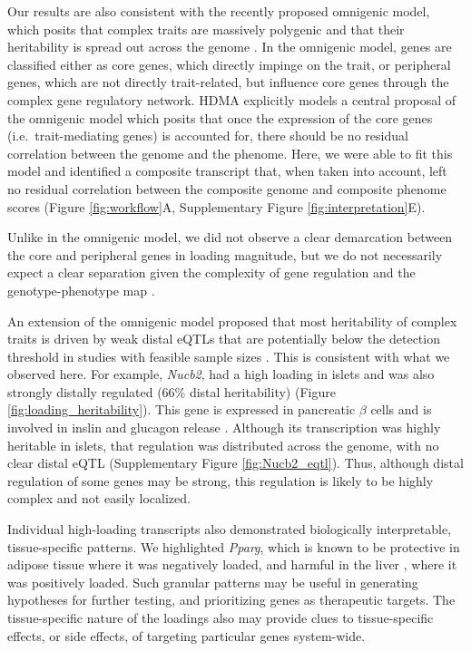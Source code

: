 \documentclass[
]{article}
\begin{document}
Our results are also consistent with the recently proposed omnigenic
model, which posits that complex traits are massively polygenic and that
their heritability is spread out across the genome \cite{pmid28622505}.
In the omnigenic model, genes are classified either as core genes, which
directly impinge on the trait, or peripheral genes, which are not
directly trait-related, but influence core genes through the complex
gene regulatory network. HDMA explicitly models a central proposal of
the omnigenic model which posits that once the expression of the core
genes (i.e.~trait-mediating genes) is accounted for, there should be no
residual correlation between the genome and the phenome. Here, we were
able to fit this model and identified a composite transcript that, when
taken into account, left no residual correlation between the composite
genome and composite phenome scores (Figure \ref{fig:workflow}A,
Supplementary Figure \ref{fig:interpretation}E).

Unlike in the omnigenic model, we did not observe a clear demarcation
between the core and peripheral genes in loading magnitude, but we do
not necessarily expect a clear separation given the complexity of gene
regulation and the genotype-phenotype map \cite{pmid29906445}.

An extension of the omnigenic model proposed that most heritability of
complex traits is driven by weak distal eQTLs that are potentially below
the detection threshold in studies with feasible sample sizes
\cite{pmid31051098}. This is consistent with what we observed here. For
example, \textit{Nucb2}, had a high loading in islets and was also
strongly distally regulated (66\% distal heritability) (Figure
\ref{fig:loading_heritability}). This gene is expressed in pancreatic
\(\beta\) cells and is involved in inslin and glucagon release
\cite{pmid24993278, pmid23537085, pmid22108805}. Although its
transcription was highly heritable in islets, that regulation was
distributed across the genome, with no clear distal eQTL (Supplementary
Figure \ref{fig:Nucb2_eqtl}). Thus, although distal regulation of some
genes may be strong, this regulation is likely to be highly complex and
not easily localized.

Individual high-loading transcripts also demonstrated biologically
interpretable, tissue-specific patterns. We highlighted \textit{Pparg},
which is known to be protective in adipose tissue \cite{pmid17389767}
where it was negatively loaded, and harmful in the liver
\cite{pmid12805374, pmid12618528, 
pmid16357043, pmid15644454, pmid16403437}, where it was positively
loaded. Such granular patterns may be useful in generating hypotheses
for further testing, and prioritizing genes as therapeutic targets. The
tissue-specific nature of the loadings also may provide clues to
tissue-specific effects, or side effects, of targeting particular genes
system-wide.
\end{document}
